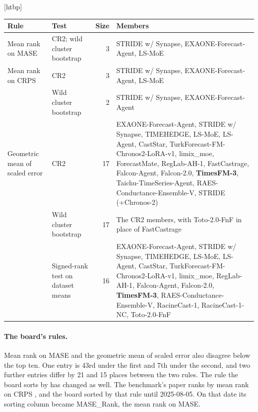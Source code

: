 \documentclass{article}
\makeatletter
\renewenvironment{table}
  {\setlength{\abovecaptionskip}{6\p@}%
   \setlength{\belowcaptionskip}{\z@}%
   \@float{table}}
  {\end@float}
\makeatother
\begin{document}
\begin{table}[htbp]
\centering
\scriptsize
\setlength{\tabcolsep}{4pt}
\begin{tabular}{@{}p{2.3cm}p{2.4cm}rp{7.4cm}@{}}
\toprule
Rule & Test & Size & Members \\
\midrule
Mean rank on MASE & \raggedright CR2; wild cluster bootstrap & 3 & \raggedright STRIDE w/ Synapse,
EXAONE-Forecast-Agent, LS-MoE \tabularnewline
\addlinespace
Mean rank on CRPS & CR2 & 3 & \raggedright STRIDE w/ Synapse, EXAONE-Forecast-Agent, LS-MoE
\tabularnewline
& Wild cluster bootstrap & 2 & \raggedright STRIDE w/ Synapse, EXAONE-Forecast-Agent
\tabularnewline
\addlinespace
\raggedright Geometric mean of scaled error & CR2 & 17 & \raggedright EXAONE-Forecast-Agent, STRIDE w/
Synapse, TIMEHEDGE, LS-MoE, LS-Agent, CastStar, TurkForecast-FM-Chronos2-LoRA-v1, limix\_moe,
ForecastMate, RegLab-AH-1, FastCastrage, Falcon-Agent, Falcon-2.0, \textbf{TimesFM-3},
Taichu-TimeSeries-Agent, RAES-Conductance-Ensemble-V, STRIDE (+Chronos-2) \tabularnewline
& Wild cluster bootstrap & 17 & \raggedright The CR2 members, with Toto-2.0-FnF in place of
FastCastrage \tabularnewline
& \raggedright Signed-rank test on dataset means & 16 & \raggedright EXAONE-Forecast-Agent, STRIDE w/
Synapse, TIMEHEDGE, LS-MoE, LS-Agent, CastStar, TurkForecast-FM-Chronos2-LoRA-v1, limix\_moe,
RegLab-AH-1, Falcon-Agent, Falcon-2.0, \textbf{TimesFM-3}, RAES-Conductance-Ensemble-V,
RacineCast-1, RacineCast-1-NC, Toto-2.0-FnF \tabularnewline
\bottomrule
\end{tabular}
\caption{Leading tier of GIFT-Eval under each rule and test. A tier holds the leader and every
entry that the uncorrected test at 5\% does not separate from it, in that rule's own order.
CR2 and the wild cluster bootstrap do not hold their level on the geometric mean. The
signed-rank test does, and it asks about the typical dataset rather than the board's
configuration-weighted mean. TimesFM-3, in bold, is a pretrained model released with
weights.}
\label{tab:tiers}
\end{table}

\paragraph{The board's rules.} Mean rank on MASE and the geometric mean of scaled error also
disagree below the top ten. One entry is 43rd under the first and 7th under the second, and
two further entries differ by 21 and 15 places between the two rules. The rule the board sorts
by has changed as well. The benchmark's paper ranks by mean rank on CRPS \citep{gifteval}, and
the board sorted by that rule until 2025-08-05. On that date its sorting column became
MASE\_Rank, the mean rank on MASE.
\end{document}
